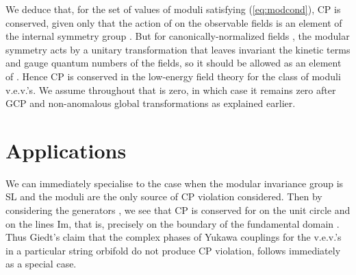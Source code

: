 \documentclass[a4paper,12pt]{article}
\begin{document}
We deduce that, for the set of values of moduli satisfying (\ref{eq:modcond}), CP is conserved, given only that the action of \coordHE{} on the observable fields is an element of the internal symmetry group \coordHE{}. But for canonically-normalized fields \myHighlight{$\Phi$}\coordHE{}, the modular symmetry acts by a unitary transformation that leaves invariant the kinetic terms and gauge quantum numbers of the fields, so it should be allowed as an element of \coordHE{}. Hence CP is conserved in the low-energy field theory for the class \coordHE{} of moduli v.e.v.'s. We assume throughout that \coordHE{} is zero, in which case it remains zero after GCP and non-anomalous global transformations as explained earlier.

\section{Applications} 
We can immediately specialise to the case when the modular invariance group is SL\coordHE{} and the \coordHE{} moduli are the only source of CP violation considered. Then by considering the generators \coordHE{}, \coordHE{} we see that CP is conserved for \coordHE{} on the unit circle and on the lines Im\coordHE{}, that is, precisely on the boundary of the fundamental domain \coordHE{}.
Thus Giedt's claim \cite{Giedt2000} that the complex phases of Yukawa couplings for the v.e.v.'s \coordHE{} in a particular string orbifold do not produce CP violation, follows immediately as a special case. 
\end{document}
